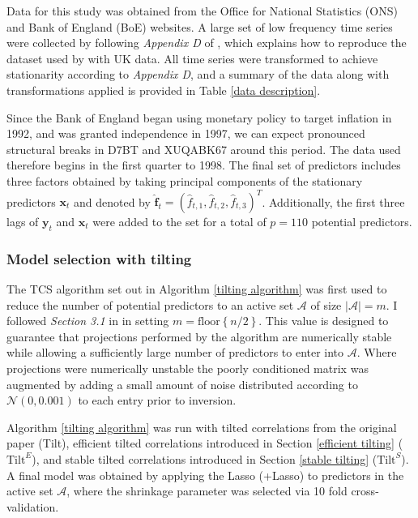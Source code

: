 \documentclass[11pt]{report}\usepackage[utf8]{inputenc}
\begin{document}
Data for this study was obtained from the Office for National Statistics (ONS) and Bank of England (BoE) websites. A large set of low frequency time series were collected by following \textit{Appendix D} of \cite{kapetanios2008forecast}, which explains how to reproduce the dataset used by \cite{stock2002macroeconomic} with UK data. All time series were transformed to achieve stationarity according to \textit{Appendix D}, and a summary of the data along with transformations applied is provided in Table \ref{data description}.

Since the Bank of England began using monetary policy to target inflation in 1992, and was granted independence in 1997, we can expect pronounced structural breaks in D7BT and XUQABK67 around this period. The data used therefore begins in the first quarter to 1998. The final set of predictors includes three factors obtained by taking principal components of the stationary predictors $\boldsymbol{x}_t$ and denoted by $\widehat{\boldsymbol{f}}_t = \left ( \widehat{f}_{t,1},\widehat{f}_{t,2},\widehat{f}_{t,3} \right )^T$. Additionally, the first three lags of $\boldsymbol{y}_{t}$ and $\boldsymbol{x}_t$ were added to the set for a total of $p = 110$ potential predictors.  

\subsubsection{Model selection with tilting}

The TCS algorithm set out in Algorithm \ref{tilting algorithm} was first used to reduce the number of potential predictors to an active set $\mathcal{A}$ of size $\left | \mathcal{A} \right | = m $. I followed \textit{Section 3.1} in \cite{cho2012high} in setting $m = \text{floor}\left \{ n/2 \right \}$. This value is designed to guarantee that projections performed by the algorithm are numerically stable while allowing a sufficiently large number of predictors to enter into $\mathcal{A}$. Where projections were numerically unstable the poorly conditioned matrix was augmented by adding a small amount of noise distributed according to $\mathcal{N}(0,0.001)$ to each entry prior to inversion.

Algorithm \ref{tilting algorithm} was run with tilted correlations from the original paper (Tilt), efficient tilted correlations introduced in Section \ref{efficient tilting} ($\text{Tilt}^E$), and stable tilted correlations introduced in Section \ref{stable tilting} ($\text{Tilt}^S$). A final model was obtained by applying the Lasso (+Lasso) to predictors in the active set $\mathcal{A}$, where the shrinkage parameter was selected via 10 fold cross-validation.
\end{document}
